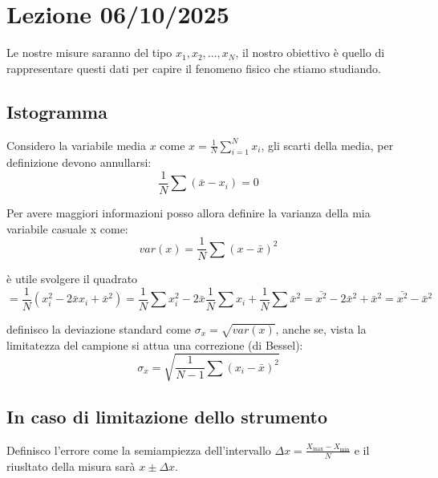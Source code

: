 \documentclass{article}
\begin{document}
\pagebreak

\section{Lezione 06/10/2025}
Le nostre misure saranno del tipo ${x_1, x_2, ..., x_N}$, il nostro obiettivo è quello di rappresentare questi dati per capire il fenomeno fisico
che stiamo studiando.\\
\subsection{Istogramma}
\begin{center}
\end{center}

Considero la variabile media $x$ come $x = \frac{1}{N} \sum_{i=1}^{N} x_i$, gli scarti della media, per definizione devono annullarsi:
\[
\frac{1}{N}\sum(\bar{x}-x_i)=0
\]

Per avere maggiori informazioni posso allora definire la varianza della mia variabile casuale x come:
\[
var(x)= \frac{1}{N} \sum (x- \bar{x})^2
\]

è utile svolgere il quadrato 
\[
= \frac{1}{N} (x_i^2 - 2 \bar{x} x_i + \bar{x}^2) = \frac{1}{N} \sum x_i^2 - 2 \bar{x} \frac{1}{N} \sum x_i + \frac{1}{N} \sum \bar{x}^2 = \bar{x^2} - 2\bar{x}^2 + \bar{x}^2 = \bar{x^2} - \bar{x}^2
\]

definisco la deviazione standard come $\sigma_x = \sqrt{var(x)}$, anche se, vista la limitatezza del campione si attua una correzione (di Bessel):
\[
\sigma_x = \sqrt{\frac{1}{N-1} \sum (x_i - \bar{x})^2}
\]
\subsection{In caso di limitazione dello strumento}
Definisco l'errore come la semiampiezza dell'intervallo $ \displaystyle \Delta x = \frac{X_{\max} - X_{\min}}{N}$ e il riusltato della misura sarà $x \pm \Delta x$.
\end{document}
